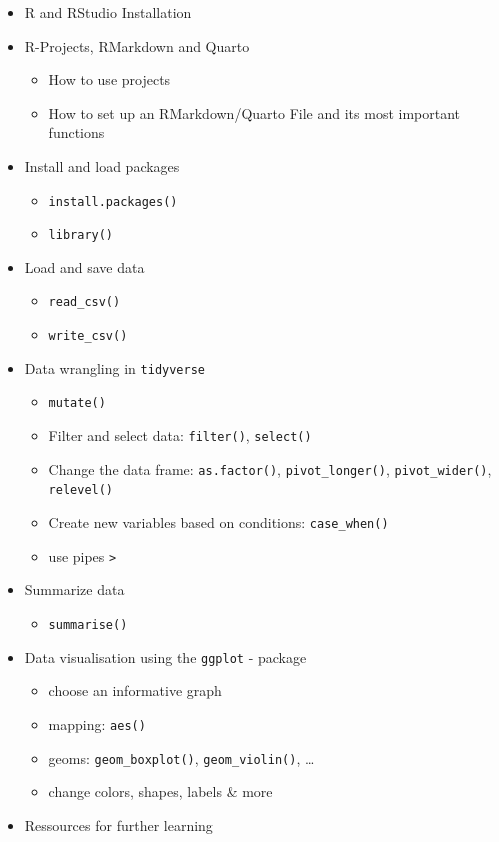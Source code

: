 \documentclass[
  letterpaper,
  DIV=11,
  numbers=noendperiod,
  oneside]{scrreprt}
\providecommand{\tightlist}{%
  \setlength{\itemsep}{0pt}\setlength{\parskip}{0pt}}\usepackage{longtable,booktabs,array}
\begin{document}
\begin{itemize}
\item
  R and RStudio Installation
\item
  R-Projects, RMarkdown and Quarto

  \begin{itemize}
  \item
    How to use projects
  \item
    How to set up an RMarkdown/Quarto File and its most important
    functions
  \end{itemize}
\item
  Install and load packages

  \begin{itemize}
  \item
    \texttt{install.packages()}
  \item
    \texttt{library()}
  \end{itemize}
\item
  Load and save data

  \begin{itemize}
  \item
    \texttt{read\_csv()}
  \item
    \texttt{write\_csv()}
  \end{itemize}
\item
  Data wrangling in \texttt{tidyverse}

  \begin{itemize}
  \item
    \texttt{mutate()}
  \item
    Filter and select data: \texttt{filter()}, \texttt{select()}
  \item
    Change the data frame: \texttt{as.factor()},
    \texttt{pivot\_longer()}, \texttt{pivot\_wider()},
    \texttt{relevel()}
  \item
    Create new variables based on conditions: \texttt{case\_when()}
  \item
    use pipes \texttt{\textbar{}\textgreater{}}
  \end{itemize}
\item
  Summarize data

  \begin{itemize}
  \tightlist
  \item
    \texttt{summarise()}
  \end{itemize}
\item
  Data visualisation using the \texttt{ggplot} - package

  \begin{itemize}
  \item
    choose an informative graph
  \item
    mapping: \texttt{aes()}
  \item
    geoms: \texttt{geom\_boxplot()}, \texttt{geom\_violin()}, \ldots{}
  \item
    change colors, shapes, labels \& more
  \end{itemize}
\item
  Ressources for further learning
\end{itemize}
\end{document}
